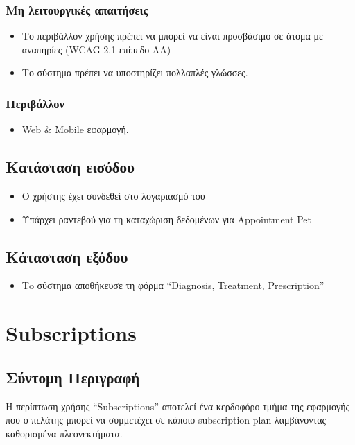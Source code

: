\documentclass[12pt,a4paper,twoside]{book}
\begin{document}
\subsubsection{Μη λειτουργικές απαιτήσεις}
\begin{itemize}
  \item Το περιβάλλον χρήσης πρέπει να μπορεί να  είναι προσβάσιμο σε  άτομα με αναπηρίες (WCAG 2.1 επίπεδο AA) %
  \item Το σύστημα πρέπει να υποστηρίζει πολλαπλές γλώσσες.
\end{itemize}

\subsubsection{Περιβάλλον}
\begin{itemize}
  \item Web \& Mobile εφαρμογή.
\end{itemize}

\subsection{Κατάσταση εισόδου} %
\begin{itemize}
  \item Ο χρήστης έχει συνδεθεί στο λογαριασμό του %
  \item Υπάρχει ραντεβού για τη καταχώριση δεδομένων για Appointment Pet   %
\end{itemize}

\subsection{Κάτασταση εξόδου} %
\begin{itemize}
  \item Τo σύστημα αποθήκευσε τη φόρμα “Diagnosis, Treatment, Prescription”
\end{itemize}


\section{Subscriptions}

\subsection{Σύντομη Περιγραφή}
Η περίπτωση χρήσης “Subscriptions” αποτελεί ένα κερδοφόρο τμήμα της εφαρμογής που ο πελάτης μπορεί να συμμετέχει σε κάποιο subscription plan λαμβάνοντας καθορισμένα πλεονεκτήματα. %
\end{document}
